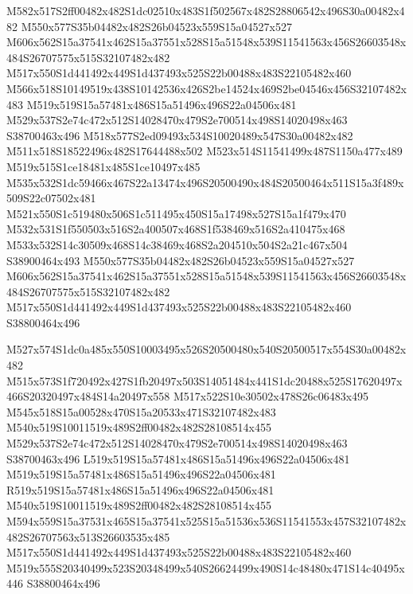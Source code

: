 \documentclass{article}
\begin{document}
\begin{multicols}{2}
M582x517S2ff00482x482S1dc02510x483S1f502567x482S28806542x496S30a00482x482 M550x577S35b04482x482S26b04523x559S15a04527x527 M606x562S15a37541x462S15a37551x528S15a51548x539S11541563x456S26603548x484S26707575x515S32107482x482 M517x550S1d441492x449S1d437493x525S22b00488x483S22105482x460 M566x518S10149519x438S10142536x426S2be14524x469S2be04546x456S32107482x483 M519x519S15a57481x486S15a51496x496S22a04506x481 M529x537S2e74c472x512S14028470x479S2e700514x498S14020498x463 S38700463x496 M518x577S2ed09493x534S10020489x547S30a00482x482 M511x518S18522496x482S17644488x502 M523x514S11541499x487S1150a477x489 M519x515S1ce18481x485S1ce10497x485 M535x532S1dc59466x467S22a13474x496S20500490x484S20500464x511S15a3f489x509S22c07502x481 M521x550S1c519480x506S1c511495x450S15a17498x527S15a1f479x470 M532x531S1f550503x516S2a400507x468S1f538469x516S2a410475x468 M533x532S14c30509x468S14c38469x468S2a204510x504S2a21c467x504 S38900464x493 M550x577S35b04482x482S26b04523x559S15a04527x527 M606x562S15a37541x462S15a37551x528S15a51548x539S11541563x456S26603548x484S26707575x515S32107482x482 M517x550S1d441492x449S1d437493x525S22b00488x483S22105482x460 S38800464x496

M527x574S1dc0a485x550S10003495x526S20500480x540S20500517x554S30a00482x482 M515x573S1f720492x427S1fb20497x503S14051484x441S1dc20488x525S17620497x466S20320497x484S14a20497x558 M517x522S10e30502x478S26c06483x495 M545x518S15a00528x470S15a20533x471S32107482x483 M540x519S10011519x489S2ff00482x482S28108514x455 M529x537S2e74c472x512S14028470x479S2e700514x498S14020498x463 S38700463x496 L519x519S15a57481x486S15a51496x496S22a04506x481 M519x519S15a57481x486S15a51496x496S22a04506x481 R519x519S15a57481x486S15a51496x496S22a04506x481 M540x519S10011519x489S2ff00482x482S28108514x455 M594x559S15a37531x465S15a37541x525S15a51536x536S11541553x457S32107482x482S26707563x513S26603535x485 M517x550S1d441492x449S1d437493x525S22b00488x483S22105482x460 M519x555S20340499x523S20348499x540S26624499x490S14c48480x471S14c40495x446 S38800464x496





\end{multicols}
\end{document}
